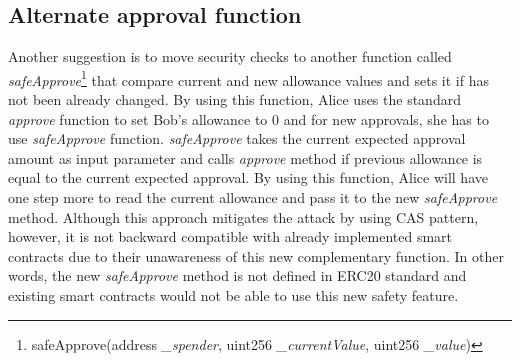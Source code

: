 \subsection{Alternate approval function}
Another suggestion\cite{Ref16} is to move security checks to another function called \textit{safeApprove}\footnote{safeApprove(address \textit{\_spender}, uint256 \textit{\_currentValue}, uint256 \textit{\_value})} that compare current and new allowance values and sets it if has not been already changed. By using this function, Alice uses the standard \textit{approve} function to set Bob’s allowance to 0 and for new approvals, she has to use \textit{safeApprove} function. \textit{safeApprove} takes the current expected approval amount as input parameter and calls \textit{approve} method if previous allowance is equal to the current expected approval. By using this function, Alice will have one step more to read the current allowance and pass it to the new \textit{safeApprove} method. Although this approach mitigates the attack by using CAS pattern\cite{Ref06}, however, it is not backward compatible with already implemented smart contracts due to their unawareness of this new complementary function. In other words, the new \textit{safeApprove} method is not defined in ERC20 standard and existing smart contracts would not be able to use this new safety feature.

